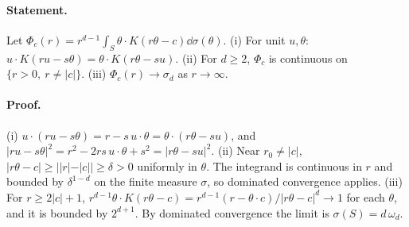 \paragraph{Statement.} Let $\Phi_c(r)=r^{d-1}\int_S\theta\cdot K(r\theta-c)\dd\sigma(\theta)$. (i) For unit $u,\theta$:
$u\cdot K(ru-s\theta)=\theta\cdot K(r\theta-su)$. (ii) For $d\geq2$, $\Phi_c$ is continuous on $\{r>0,\ r\neq|c|\}$.
(iii) $\Phi_c(r)\to\sigma_d$ as $r\to\infty$.
\paragraph{Proof.} (i) $u\cdot(ru-s\theta)=r-s\,u\cdot\theta=\theta\cdot(r\theta-su)$, and
$|ru-s\theta|^2=r^2-2rs\,u\cdot\theta+s^2=|r\theta-su|^2$. (ii) Near $r_0\neq|c|$, $|r\theta-c|\geq||r|-|c||\geq\delta>0$
uniformly in $\theta$. The integrand is continuous in $r$ and bounded by $\delta^{1-d}$ on the finite measure
$\sigma$, so dominated convergence applies. (iii) For $r\geq2|c|+1$,
$r^{d-1}\theta\cdot K(r\theta-c)=r^{d-1}(r-\theta\cdot c)/|r\theta-c|^d\to1$ for each $\theta$, and it is bounded by
$2^{d+1}$. By dominated convergence the limit is $\sigma(S)=d\,\omega_d$.

